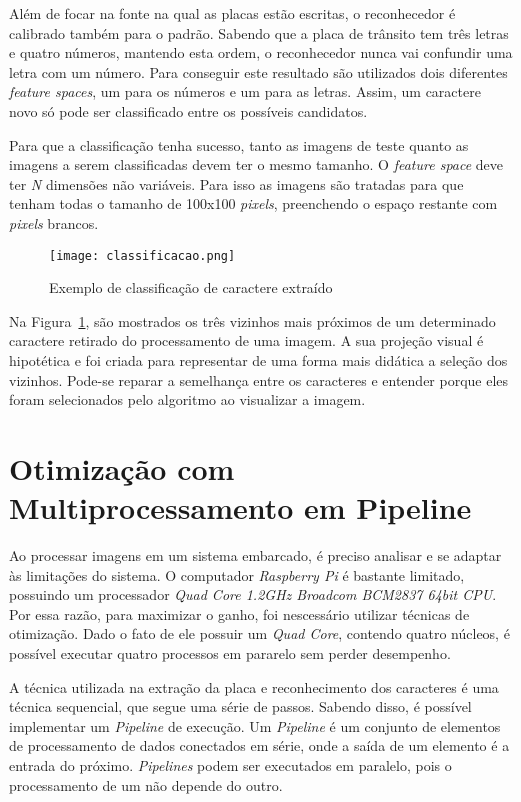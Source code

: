 Além de focar na fonte na qual as placas estão escritas, o reconhecedor é
calibrado também para o padrão. Sabendo que a placa de trânsito tem três letras
e quatro números, mantendo esta ordem, o reconhecedor nunca vai confundir uma
letra com um número. Para conseguir este resultado são utilizados dois
diferentes \emph{feature spaces}, um para os números e um para as letras. Assim,
um caractere novo só pode ser classificado entre os possíveis candidatos.

Para que a classificação tenha sucesso, tanto as imagens de teste quanto as
imagens a serem classificadas devem ter o mesmo tamanho. O \emph{feature space}
deve ter \emph{N} dimensões não variáveis. Para isso as imagens são tratadas
para que tenham todas o tamanho de 100x100 \emph{pixels}, preenchendo o espaço
restante com \emph{pixels} brancos.

\begin{figure}[H]
	\centering
	\texttt{[image: classificacao.png]}
	\caption{Exemplo de classificação de caractere extraído}
	\label{fig:classificacao}
\end{figure}

Na Figura~\ref{fig:classificacao}, são mostrados os três vizinhos mais próximos
de um determinado caractere retirado do processamento de uma imagem. A sua
projeção visual é hipotética e foi criada para representar de uma forma mais
didática a seleção dos vizinhos. Pode-se reparar a semelhança entre os
caracteres e entender porque eles foram selecionados pelo algoritmo ao
visualizar a imagem.

\section{Otimização com Multiprocessamento em Pipeline} \label{sec:otimizacao}

Ao processar imagens em um sistema embarcado, é preciso analisar e se adaptar às
limitações do sistema. O computador \emph{Raspberry Pi} é bastante limitado,
possuindo um processador \emph{Quad Core 1.2GHz Broadcom BCM2837 64bit CPU}. Por
essa razão, para maximizar o ganho, foi nescessário utilizar técnicas de
otimização. Dado o fato de ele possuir um \emph{Quad Core}, contendo quatro
núcleos, é possível executar quatro processos em pararelo sem perder desempenho.

A técnica utilizada na extração da placa e reconhecimento dos caracteres é uma
técnica sequencial, que segue uma série de passos. Sabendo disso, é possível
implementar um \emph{Pipeline} de execução. Um \emph{Pipeline} é um conjunto de
elementos de processamento de dados conectados em série, onde a saída de um
elemento é a entrada do próximo. \emph{Pipelines} podem ser executados em
paralelo, pois o processamento de um não depende do outro.

